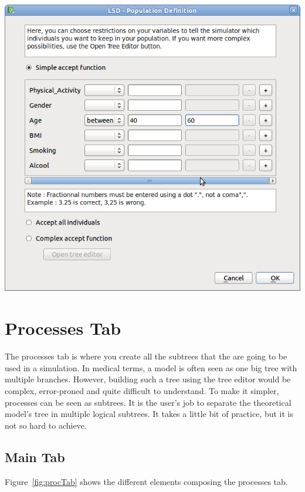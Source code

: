 \documentclass[a4paper,11pt]{report}
\begin{document}
\begin{center}
\includegraphics[scale=0.3]{Pictures/Population/Submenu/AccFunc.png}
\label{fig:accFunc}
\end{center}

\section{Processes Tab}
\label{sec:procTab}
The processes tab is where you create all the subtrees that the are going to be used in a simulation. In medical terms, a model is often seen as one big tree with multiple branches. However, building such a tree using the tree editor would be complex, error-proned and quite difficult to understand. To make it simpler, processes can be seen as subtrees. It is the user's job to separate the theoretical model's tree in multiple logical subtrees. It takes a little bit of practice, but it is not so hard to achieve. 

\subsection{Main Tab}
Figure~\ref{fig:procTab} shows the different elements composing the processes tab.
\end{document}
